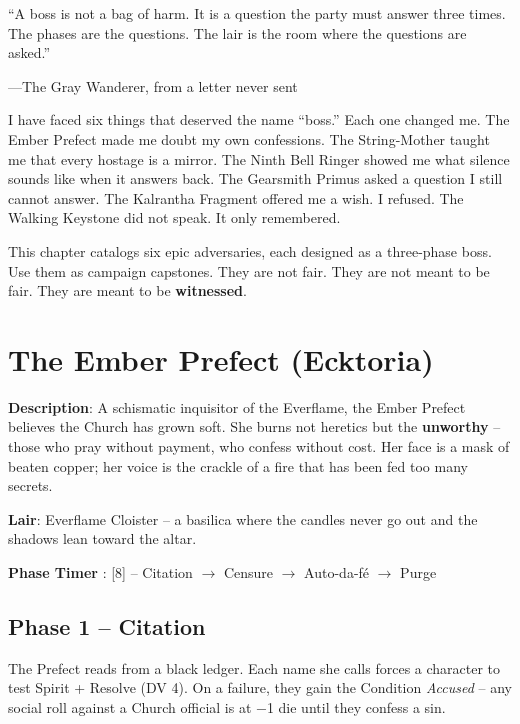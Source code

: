 
\epigraph{``A boss is not a bag of harm. It is a question the party must answer three times. The phases are the questions. The lair is the room where the questions are asked.''}{---The Gray Wanderer, from a letter never sent}

I have faced six things that deserved the name ``boss.'' Each one changed me. The Ember Prefect made me doubt my own confessions. The String-Mother taught me that every hostage is a mirror. The Ninth Bell Ringer showed me what silence sounds like when it answers back. The Gearsmith Primus asked a question I still cannot answer. The Kalrantha Fragment offered me a wish. I refused. The Walking Keystone did not speak. It only remembered.

This chapter catalogs six epic adversaries, each designed as a three-phase boss. Use them as campaign capstones. They are not fair. They are not meant to be fair. They are meant to be \textbf{witnessed}.

\section*{The Ember Prefect (Ecktoria)}

\noindent\textbf{Description}: A schismatic inquisitor of the Everflame, the Ember Prefect believes the Church has grown soft. She burns not heretics but the \textbf{unworthy} -- those who pray without payment, who confess without cost. Her face is a mask of beaten copper; her voice is the crackle of a fire that has been fed too many secrets.

\noindent\textbf{Lair}: Everflame Cloister -- a basilica where the candles never go out and the shadows lean toward the altar.

\noindent\textbf{Phase Timer }: [8] -- Citation $\rightarrow$ Censure $\rightarrow$ Auto-da-fé $\rightarrow$ Purge

\subsection*{Phase 1 -- Citation}

\noindent The Prefect reads from a black ledger. Each name she calls forces a character to test Spirit + Resolve (DV 4). On a failure, they gain the Condition \emph{Accused} -- any social roll against a Church official is at −1 die until they confess a sin.


